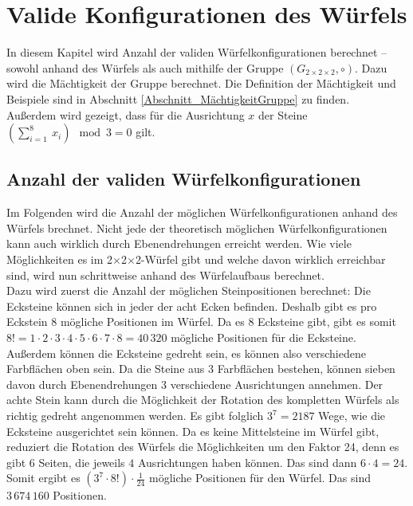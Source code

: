 \documentclass[12pt,a4paper, usenames, dvipsnames]{article}
\theoremstyle{mystyle}
\theoremstyle{definition}
\newcommand{\Gtwo}{\ensuremath{G_{2\times 2\times 2}}}
\newcommand{\Ttwo}{2$\times$2$\times$2-}
\begin{document}
%
%
%
%
%
%
%
%
%
%
%
%
%
%
%
%
%
\newpage

\section{Valide Konfigurationen des Würfels}

\label{Kapitel_ValideKonfigurationen}

In diesem Kapitel wird Anzahl der validen Würfelkonfigurationen berechnet -- sowohl anhand des Würfels als auch mithilfe der Gruppe $(\Gtwo,\circ)$. Dazu wird die Mächtigkeit der Gruppe berechnet. Die Definition der Mächtigkeit und Beispiele sind in Abschnitt \ref{Abschnitt_MächtigkeitGruppe} zu finden. \\
Außerdem wird gezeigt, dass für die Ausrichtung $x$ der Steine $( \sum_{i= 1}^{8} \ x_i ) \mod 3 = 0$ gilt.

%
%
%
%
%
%
%
%
%
%
%
%
%
%
%
%
%
%
%
\subsection{Anzahl der validen Würfelkonfigurationen}
\label{Abschnitt_AnzahlKonfigurationen}

Im Folgenden wird die Anzahl der möglichen Würfelkonfigurationen anhand des Würfels brechnet. Nicht jede der theoretisch möglichen Würfelkonfigurationen kann auch wirklich durch Ebenendrehungen erreicht werden. Wie viele Möglichkeiten es im \Ttwo Würfel gibt und welche davon wirklich erreichbar sind, wird nun schrittweise anhand des Würfelaufbaus berechnet. \\
Dazu wird zuerst die Anzahl der möglichen Steinpositionen berechnet:
Die Ecksteine können sich in jeder der acht Ecken befinden. Deshalb gibt es pro Eckstein 8 mögliche Positionen im Würfel. Da es 8 Ecksteine gibt, gibt es somit $8! = 1 \cdot 2 \cdot 3 \cdot 4 \cdot 5 \cdot 6 \cdot 7 \cdot 8 = 40\, 320$ mögliche Positionen für die Ecksteine. \\
Außerdem können die Ecksteine gedreht sein, es können also verschiedene Farbflächen oben sein. Da die Steine aus 3 Farbflächen bestehen, können sieben davon durch Ebenendrehungen 3 verschiedene Ausrichtungen annehmen. Der achte Stein kann durch die Möglichkeit der Rotation des kompletten Würfels als richtig gedreht angenommen werden. Es gibt folglich $3^7 = 2187$ Wege, wie die Ecksteine ausgerichtet sein können.
Da es keine Mittelsteine im Würfel gibt, reduziert die Rotation des Würfels die Möglichkeiten um den Faktor 24, denn es gibt $6$ Seiten, die jeweils $4$ Ausrichtungen haben können. Das sind dann $6 \cdot 4 = 24$.
Somit ergibt es $(3^7 \cdot 8!) \cdot \frac{1}{24}$ mögliche Positionen für den Würfel. Das sind $3\, 674\, 160$ Positionen.
\end{document}
